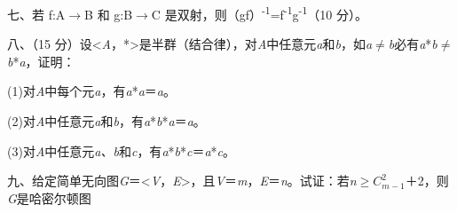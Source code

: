 \documentclass[fontset=exam]{exam-zh}
\begin{document}

七、若 f:A\(\to\)B 和 g:B\(\to\)C 是双射，则（gf）\textsuperscript{-1}=f\textsuperscript{-1}g\textsuperscript{-1}（10 分）。


八、（15 分）设\textless{}\emph{A}，*\textgreater 是半群（结合律），对\emph{A}中任意元\emph{a}和\emph{b}，如\emph{a}\(\ne\)\emph{b}必有\emph{a}*\emph{b}\(\ne\)\emph{b}*\emph{a}，证明：

(1)对\emph{A}中每个元\emph{a}，有\emph{a}*\emph{a}＝\emph{a}。

(2)对\emph{A}中任意元\emph{a}和\emph{b}，有\emph{a}*\emph{b}*\emph{a}＝\emph{a}。

(3)对\emph{A}中任意元\emph{a、b}和\emph{c}，有\emph{a}*\emph{b}*\emph{c}＝\emph{a}*\emph{c}。


九、给定简单无向图\emph{G}＝\textless{}\emph{V}，\emph{E}\textgreater，且\textbar{}\emph{V}\textbar＝\emph{m}，\textbar{}\emph{E}\textbar＝\emph{n}。试证：若\emph{n}\(\ge\)\(C_{m - 1}^{2}\)＋2，则\emph{G}是哈密尔顿图
\end{document}
